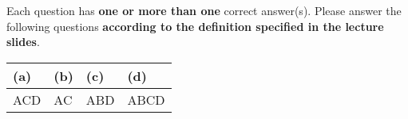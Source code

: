 
Each question has \textbf{one or more than one} correct answer(s). Please answer the following questions \textbf{according to  the definition specified in the lecture slides}.


\begin{table}[htbp]
	\centering
	\begin{tabular}{|p{2cm}|p{2cm}|p{2cm}|p{2cm}|}
		\hline
		(a) & (b) & (c) & (d)\\
		\hline
		 ACD   & AC    &  ABD   & ABCD\\
		\hline
	\end{tabular}
\end{table}

